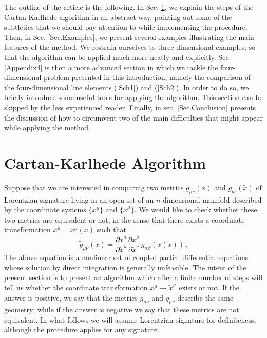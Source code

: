 \documentclass[twocolumn,prd,aps,showpacs,showkeys,amsmath,amssymb]{revtex4-1}
\begin{document}
The outline of the article is the following. In Sec. \ref{Sec.Algorithm}, we explain the steps of the Cartan-Karlhede algorithm in an abstract way, pointing out some of the subtleties that we should pay attention to while implementing the procedure. Then, in Sec. \ref{Sec.Examples}, we present several examples illustrating the main features of the method. We restrain ourselves to three-dimensional examples, so that the algorithm can be applied  much more neatly and explicitly. Sec. \ref{Appendix4} is then a more advanced section in which we tackle the four-dimensional problem presented in this introduction, namely the comparison of the four-dimensional line elements (\ref{Sch1}) and (\ref{Sch2}). In order to do so, we briefly introduce some useful tools for applying the algorithm. This section can be skipped by the less experienced reader. Finally, in sec. \ref{Sec.Conclusion} presents the discussion of how to circumvent two of the main difficulties that might appear while applying the method.




\section{Cartan-Karlhede Algorithm}\label{Sec.Algorithm}


Suppose that we are interested in comparing two metrics $g_{\mu\nu}(x)$ and  $\tilde{g}_{ab}(\tilde{x})$ of Lorentzian signature living in an open set of an $n$-dimensional manifold described by the coordinate systems $\{x^\mu\}$ and $\{\tilde{x}^\mu\}$. We would like to check whether these two metrics are equivalent or not, in the sense that there exists a coordinate transformation $x^\mu=x^\mu(\tilde{x})$ such that
\begin{equation*}
  \tilde{g}_{\mu\nu}(\tilde{x}) =
  \frac{\partial x^\alpha}{\partial \tilde{x}^\mu} \frac{\partial x^\beta}{\partial \tilde{x}^\nu}\,g_{\alpha\beta}(x(\tilde{x})) \,.
\end{equation*}
The above equation is a nonlinear set of coupled partial differential equations whose solution by direct integration is generally  unfeasible. The intent of the present section is to present an algorithm which after a finite number of steps will tell us whether the coordinate transformation $x^\mu\rightarrow \tilde{x}^\mu$ exists or not. If the answer is positive, we say that the metrics $g_{\mu\nu}$ and  $\tilde{g}_{\mu\nu}$ describe the same geometry; while if the answer is negative we say that these metrics are not equivalent. In what follows we will assume Lorentzian signature for definiteness, although the procedure applies for any signature.
\end{document}
